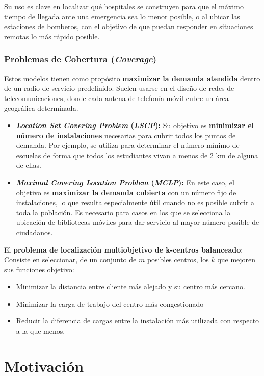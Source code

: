 \documentclass[12pt,a4paper]{book}
\begin{document}
Su uso es clave en localizar qué hospitales se construyen para que el máximo tiempo de llegada ante una emergencia sea lo menor posible, o al ubicar las estaciones de bomberos, con el objetivo de que puedan responder
en situaciones remotas lo más rápido posible.

\subsubsection{Problemas de Cobertura (\textit{Coverage})} 
Estos modelos tienen como propósito \textbf{maximizar la demanda atendida} dentro de un radio de servicio predefinido. 
Suelen usarse en el diseño de redes de telecomunicaciones, donde cada antena de telefonía móvil cubre un área geográfica determinada.

\begin{itemize}
    \item \textbf{\textit{Location Set Covering Problem} (\textit{LSCP}):}
    Su objetivo es \textbf{minimizar el número de instalaciones} necesarias para cubrir todos los puntos de demanda.
Por ejemplo, se utiliza para determinar el número mínimo de escuelas de forma que todos los estudiantes vivan a menos de 2 km de alguna de ellas.

    \item \textbf{\textit{Maximal Covering Location Problem} (\textit{MCLP}):}
En este caso, el objetivo es \textbf{maximizar la demanda cubierta} con un número fijo de instalaciones, lo que resulta especialmente útil cuando no es posible cubrir a toda la población.
Es necesario para casos en los que se selecciona la ubicación de bibliotecas móviles para dar servicio al mayor número posible de ciudadanos.

\end{itemize}

El \textbf{problema de localización multiobjetivo de k-centros balanceado}: Consiste en seleccionar, de un conjunto de $m$ posibles centros, los $k$ que mejoren sus funciones objetivo:
\begin{itemize}
    \item Minimizar la distancia entre cliente más alejado y su centro más cercano.
    \item Minimizar la carga de trabajo del centro más congestionado
    \item Reducir la diferencia de cargas entre la instalación más utilizada con respecto a la que menos.
\end{itemize}

\section{Motivación}
\end{document}
